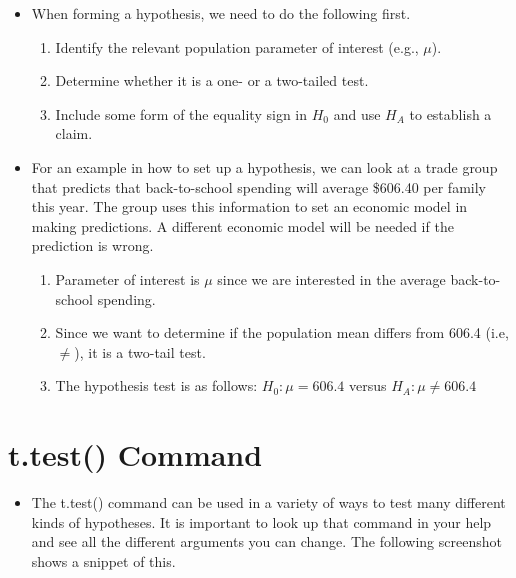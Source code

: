 \documentclass[
  letterpaper,
  DIV=11,
  numbers=noendperiod]{scrreprt}
\providecommand{\tightlist}{%
  \setlength{\itemsep}{0pt}\setlength{\parskip}{0pt}}\usepackage{longtable,booktabs,array}
\begin{document}
\begin{itemize}
\tightlist
\item
  When forming a hypothesis, we need to do the following first.

  \begin{enumerate}
  \def\labelenumi{\arabic{enumi}.}
  \tightlist
  \item
    Identify the relevant population parameter of interest (e.g.,
    \(\mu\)).
  \item
    Determine whether it is a one- or a two-tailed test.
  \item
    Include some form of the equality sign in \(H_0\) and use \(H_A\) to
    establish a claim.
  \end{enumerate}
\item
  For an example in how to set up a hypothesis, we can look at a trade
  group that predicts that back-to-school spending will average \$606.40
  per family this year. The group uses this information to set an
  economic model in making predictions. A different economic model will
  be needed if the prediction is wrong.

  \begin{enumerate}
  \def\labelenumi{\arabic{enumi}.}
  \tightlist
  \item
    Parameter of interest is \(\mu\) since we are interested in the
    average back-to-school spending.
  \item
    Since we want to determine if the population mean differs from 606.4
    (i.e, \(\neq\)), it is a two-tail test.
  \item
    The hypothesis test is as follows: \(H_0: \mu = 606.4\) versus
    \(H_A: \mu \neq 606.4\)
  \end{enumerate}
\end{itemize}

\section{t.test() Command}\label{t.test-command}

\begin{itemize}
\tightlist
\item
  The t.test() command can be used in a variety of ways to test many
  different kinds of hypotheses. It is important to look up that command
  in your help and see all the different arguments you can change. The
  following screenshot shows a snippet of this.
\end{itemize}
\end{document}

